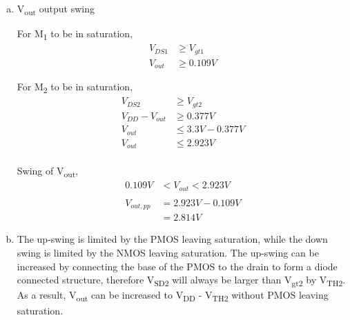 \documentclass{article}
\begin{document}
\begin{enumerate}[(a)]
\item V\textsubscript{out} output swing

For M\textsubscript{1} to be in saturation,
\begin{equation*}
\begin{aligned}
V_{DS1} &\geq V_{gt1}\\
V_{out} &\geq 0.109 V
\end{aligned}
\end{equation*}

For M\textsubscript{2} to be in saturation,
\begin{equation*}
\begin{aligned}
V_{DS2} &\geq V_{gt2} \\
V_{DD} - V_{out} &\geq 0.377 V \\
V_{out} &\leq 3.3 V - 0.377 V \\
V_{out} &\leq 2.923 V \\
\end{aligned}
\end{equation*}

Swing of V\textsubscript{out},
\begin{equation*}
\begin{aligned}
0.109 V &< V_{out} < 2.923 V \\
\\
V_{out, pp} &= 2.923 V - 0.109 V \\
&= 2.814 V
\end{aligned}
\end{equation*}

\item The up-swing is limited by the PMOS leaving saturation, while the down swing is limited by the NMOS leaving saturation.
The up-swing can be increased by connecting the base of the PMOS to the drain to form a diode connected structure,
therefore V\textsubscript{SD2} will always be larger than V\textsubscript{gt2} by V\textsubscript{TH2}.
As a result, V\textsubscript{out} can be increased to V\textsubscript{DD} - V\textsubscript{TH2} without PMOS leaving saturation.
\end{enumerate}
\end{document}
